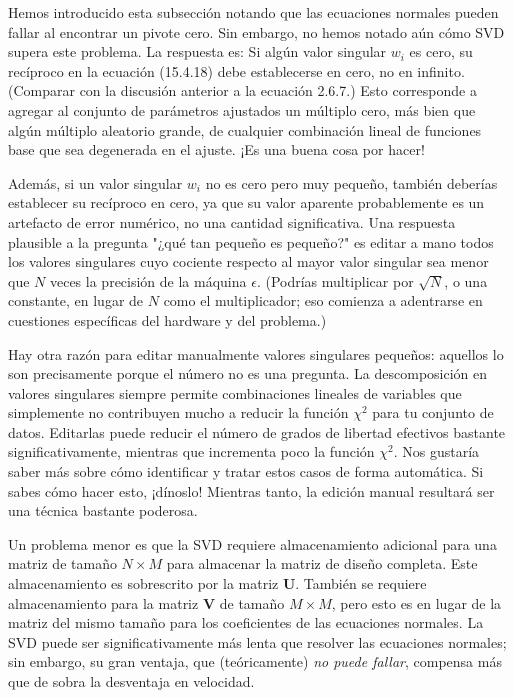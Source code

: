 \documentclass[10pt,a4paper]{book}
\begin{document}
Hemos introducido esta subsección notando que las ecuaciones normales pueden fallar al encontrar un pivote cero. Sin embargo, no hemos notado aún cómo SVD supera este problema. La respuesta es: Si algún valor singular $w_i$ es cero, su recíproco en la ecuación (15.4.18) debe establecerse en cero, no en infinito. (Comparar con la discusión anterior a la ecuación 2.6.7.) Esto corresponde a agregar al conjunto de parámetros ajustados un múltiplo cero, más bien que algún múltiplo aleatorio grande, de cualquier combinación lineal de funciones base que sea degenerada en el ajuste. ¡Es una buena cosa por hacer!

Además, si un valor singular $w_i$ no es cero pero muy pequeño, también deberías establecer su recíproco en cero, ya que su valor aparente probablemente es un artefacto de error numérico, no una cantidad significativa. Una respuesta plausible a la pregunta "¿qué tan pequeño es pequeño?" es editar a mano todos los valores singulares cuyo cociente respecto al mayor valor singular sea menor que $N$ veces la precisión de la máquina $\epsilon$. (Podrías multiplicar por $\sqrt{N}$, o una constante, en lugar de $N$ como el multiplicador; eso comienza a adentrarse en cuestiones específicas del hardware y del problema.)

Hay otra razón para editar manualmente valores singulares pequeños: aquellos lo son precisamente porque el número no es una pregunta. La descomposición en valores singulares siempre permite combinaciones lineales de variables que simplemente no contribuyen mucho a reducir la función $\chi^2$ para tu conjunto de datos. Editarlas puede reducir el número de grados de libertad efectivos bastante significativamente, mientras que incrementa poco la función $\chi^2$. Nos gustaría saber más sobre cómo identificar y tratar estos casos de forma automática. Si sabes cómo hacer esto, ¡dínoslo! Mientras tanto, la edición manual resultará ser una técnica bastante poderosa.

Un problema menor es que la SVD requiere almacenamiento adicional para una matriz de tamaño $N \times M$ para almacenar la matriz de diseño completa. Este almacenamiento es sobrescrito por la matriz $\mathbf{U}$. También se requiere almacenamiento para la matriz $\mathbf{V}$ de tamaño $M \times M$, pero esto es en lugar de la matriz del mismo tamaño para los coeficientes de las ecuaciones normales. La SVD puede ser significativamente más lenta que resolver las ecuaciones normales; sin embargo, su gran ventaja, que (teóricamente) \textit{no puede fallar}, compensa más que de sobra la desventaja en velocidad.
\end{document}
